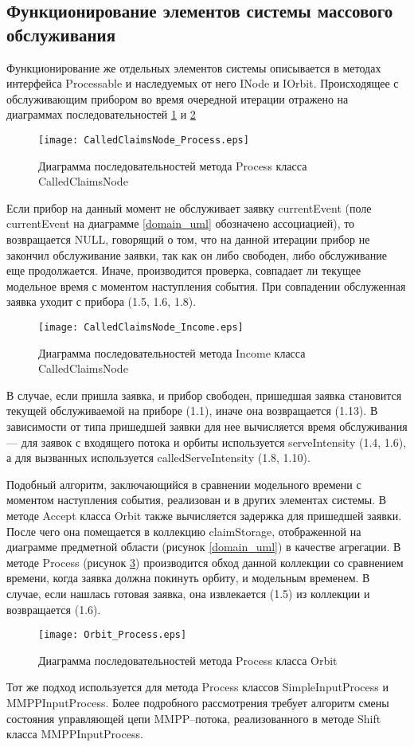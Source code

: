 \subsection{Функционирование элементов системы массового обслуживания}
Функционирование же отдельных элементов системы описывается в методах интерфейса Processable и наследуемых от него INode и IOrbit.
Происходящее с обслуживающим прибором во время очередной итерации отражено на диаграммах последовательностей \ref{CalledClaimsNode_Process_uml} и \ref{CalledClaimsNode_Income_uml}
\begin{figure}[H]
	\centering
	\texttt{[image: CalledClaimsNode\_Process.eps]}
	\caption{Диаграмма последовательностей метода Process класса CalledClaimsNode}
	\label{CalledClaimsNode_Process_uml}
\end{figure}
Если прибор на данный момент не обслуживает заявку currentEvent (поле currentEvent на диаграмме \ref{domain_uml} обозначено ассоциацией), то возвращается NULL, говорящий о том, что на данной итерации прибор не закончил обслуживание заявки, так как он либо свободен, либо обслуживание еще продолжается. Иначе, производится проверка, совпадает ли текущее модельное время с моментом наступления события. При совпадении обслуженная заявка уходит с прибора (1.5, 1.6, 1.8).
\begin{figure}[H]
	\centering
	\texttt{[image: CalledClaimsNode\_Income.eps]}
	\caption{Диаграмма последовательностей метода Income класса CalledClaimsNode}
	\label{CalledClaimsNode_Income_uml}
\end{figure}
В случае, если пришла заявка, и прибор свободен, пришедшая заявка становится текущей обслуживаемой на приборе (1.1), иначе она возвращается (1.13). В зависимости от типа пришедшей заявки для нее вычисляется время обслуживания --- для заявок с входящего потока и орбиты используется serveIntensity (1.4, 1.6), а для  вызванных используется calledServeIntensity (1.8, 1.10).

Подобный алгоритм, заключающийся в сравнении модельного времени с моментом наступления события, реализован и в других элементах системы.
В методе Accept класса Orbit также вычисляется задержка для пришедшей заявки. После чего она помещается в коллекцию claimStorage, отображенной на диаграмме предметной области (рисунок \ref{domain_uml}) в качестве агрегации. В методе Process (рисунок \ref{Orbit_Process_uml}) производится обход данной коллекции со сравнением времени, когда заявка должна покинуть орбиту, и модельным временем. В случае, если нашлась готовая заявка, она извлекается (1.5) из коллекции и возвращается (1.6).
 \begin{figure}[H]
 	\centering
 	\texttt{[image: Orbit\_Process.eps]}
 	\caption{Диаграмма последовательностей метода Process класса Orbit}
 	\label{Orbit_Process_uml}
 \end{figure}
Тот же подход используется для метода Process классов SimpleInputProcess и \\ MMPPInputProcess. Более подробного рассмотрения требует алгоритм смены состояния управляющей цепи MMPP--потока, реализованного в методе Shift класса MMPPInputProcess.

